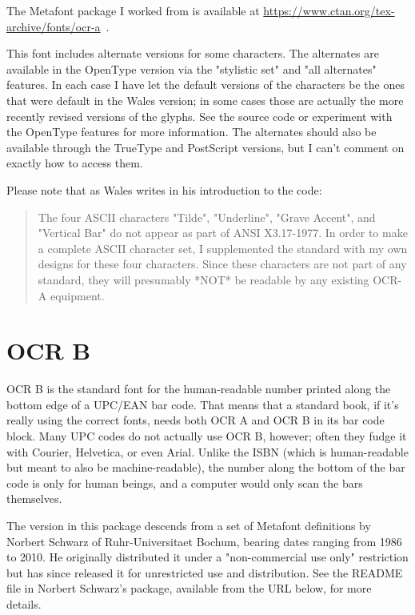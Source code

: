 \documentclass{article}
\begin{document}
The Metafont package I worked from is available at
\url{https://www.ctan.org/tex-archive/fonts/ocr-a}~.

This font includes alternate versions for some characters.  The alternates
are available in the OpenType version via the "stylistic set" and "all
alternates" features.  In each case I have let the default versions of the
characters be the ones that were default in the Wales version; in some cases
those are actually the more recently revised versions of the glyphs.  See
the source code or experiment with the OpenType features for more
information.  The alternates should also be available through the TrueType
and PostScript versions, but I can't comment on exactly how to access them.

Please note that as Wales writes in his introduction to the code:
\begin{quotation}
The four ASCII characters "Tilde", "Underline", "Grave Accent",
and "Vertical Bar" do not appear as part of ANSI X3.17-1977.
In order to make a complete ASCII character set, I supplemented
the standard with my own designs for these four characters.
Since these characters are not part of any standard, they will
presumably *NOT* be readable by any existing OCR-A equipment.
\end{quotation}

\setmainfont{OCRB.otf}
\setmonofont{OCRB.otf}
\section{OCR B}

OCR B is the standard font for the human-readable number printed along the
bottom edge of a UPC/EAN bar code.  That means that a standard book, if it's
really using the correct fonts, needs both OCR A and OCR B in its bar code
block.  Many UPC codes do not actually use OCR B, however; often they fudge
it with Courier, Helvetica, or even Arial.  Unlike the ISBN (which is
human-readable but meant to also be machine-readable), the number
along the bottom of the bar code is only for human beings, and a computer
would only scan the bars themselves.

The version in this package descends from a set of Metafont definitions by
Norbert Schwarz of Ruhr-Universitaet Bochum, bearing dates ranging from 1986
to 2010.  He originally distributed it under a "non-commercial use only"
restriction but has since released it for unrestricted use and distribution. 
See the README file in Norbert Schwarz's package, available from the
URL below, for more details.
\end{document}
